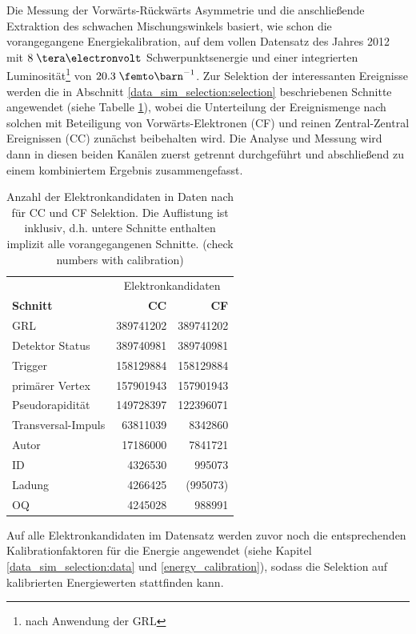 Die Messung der Vorwärts-Rückwärts Asymmetrie und die anschließende Extraktion
des schwachen Mischungswinkels basiert, wie schon die vorangegangene
Energiekalibration, auf dem vollen Datensatz des Jahres 2012 mit $8\TeV$
Schwerpunktsenergie und einer integrierten Luminosität\footnote{nach Anwendung
der \ac{GRL}} von $20.3\fb^{-1}$. Zur Selektion der interessanten Ereignisse
werden die in Abschnitt \ref{data_sim_selection:selection} beschriebenen
Schnitte angewendet (siehe Tabelle \ref{tab:data_selection}), wobei die
Unterteilung der Ereignismenge nach solchen mit Beteiligung von
Vorwärts-Elektronen (CF) und reinen Zentral-Zentral Ereignissen (CC) zunächst
beibehalten wird. Die Analyse und Messung wird dann in diesen beiden Kanälen
zuerst getrennt durchgeführt und abschließend zu einem kombiniertem Ergebnis
zusammengefasst.
\begin{table} [h]
    \centering
    \begin{tabular}{|l|r|r|}
        \hline
        & \multicolumn{2}{|c|}{Elektronkandidaten}   \\
        \textbf{Schnitt} & \textbf{CC} & \textbf{CF} \\  %
        \hline\hline
        \ac{GRL}           & 389741202 & 389741202   \\  %
        Detektor Status    & 389740981 & 389740981   \\  %
        Trigger            & 158129884 & 158129884   \\  %
        primärer Vertex    & 157901943 & 157901943   \\  %
        Pseudorapidität    & 149728397 & 122396071   \\  %
        Transversal-Impuls &  63811039 &   8342860   \\  %
        Autor              &  17186000 &   7841721   \\  %
        ID                 &   4326530 &    995073   \\  %
        Ladung             &   4266425 &  (995073)   \\  %
        OQ                 &   4245028 &    988991   \\  %
        \hline
    \end{tabular}
    \caption[Anzahl der Elektronkandidaten in Daten für CC und CF Selektion]
        {Anzahl der Elektronkandidaten in Daten nach für CC und CF Selektion.
        Die Auflistung ist inklusiv, d.h. untere Schnitte enthalten implizit
        alle vorangegangenen Schnitte. \development (check numbers with
        calibration)}
    \label{tab:data_selection}
\end{table}
Auf alle Elektronkandidaten im Datensatz werden zuvor noch die entsprechenden
Kalibrationfaktoren für die Energie angewendet (siehe Kapitel
\ref{data_sim_selection:data} und \ref{energy_calibration}), sodass die
Selektion auf kalibrierten Energiewerten stattfinden kann.

